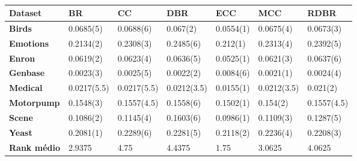 \begin{table}[h]
\begin{tabular}{lllllll}
\hline
\textbf{Dataset}    & \textbf{BR} & \textbf{CC} & \textbf{DBR} & \textbf{ECC} & \textbf{MCC} & \textbf{RDBR} \\ \hline
\textbf{Birds}      & 0.0685(5)   & 0.0688(6)   & 0.067(2)     & 0.0554(1)    & 0.0675(4)    & 0.0673(3)     \\
\textbf{Emotions}   & 0.2134(2)   & 0.2308(3)   & 0.2485(6)    & 0.212(1)     & 0.2313(4)    & 0.2392(5)     \\
\textbf{Enron}      & 0.0619(2)   & 0.0623(4)   & 0.0636(5)    & 0.0525(1)    & 0.0621(3)    & 0.0637(6)     \\
\textbf{Genbase}    & 0.0023(3)   & 0.0025(5)   & 0.0022(2)    & 0.0084(6)    & 0.0021(1)    & 0.0024(4)     \\
\textbf{Medical}    & 0.0217(5.5) & 0.0217(5.5) & 0.0212(3.5)  & 0.0155(1)    & 0.0212(3.5)  & 0.021(2)      \\
\textbf{Motorpump}  & 0.1548(3)   & 0.1557(4.5) & 0.1558(6)    & 0.1502(1)    & 0.154(2)     & 0.1557(4.5)   \\
\textbf{Scene}      & 0.1086(2)   & 0.1145(4)   & 0.1603(6)    & 0.0986(1)    & 0.1109(3)    & 0.1287(5)     \\
\textbf{Yeast}      & 0.2081(1)   & 0.2289(6)   & 0.2281(5)    & 0.2118(2)    & 0.2236(4)    & 0.2208(3)     \\ \hline
\textbf{Rank médio} & 2.9375      & 4.75        & 4.4375       & 1.75         & 3.0625       & 4.0625        \\ \hline
\end{tabular}
\caption{}
\label{tab:HLlogi}
\end{table}